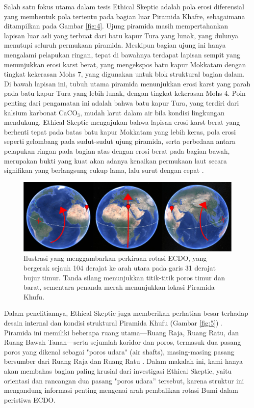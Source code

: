 \documentclass[10pt,twocolumn,letterpaper]{article}
\begin{document}
Salah satu fokus utama dalam tesis Ethical Skeptic adalah pola erosi diferensial yang membentuk pola tertentu pada bagian luar Piramida Khafre, sebagaimana ditampilkan pada Gambar \ref{fig:4}. Ujung piramida masih mempertahankan lapisan luar asli yang terbuat dari batu kapur Tura yang lunak, yang dulunya menutupi seluruh permukaan piramida. Meskipun bagian ujung ini hanya mengalami pelapukan ringan, tepat di bawahnya terdapat lapisan sempit yang menunjukkan erosi karst berat, yang mengekspos batu kapur Mokkatam dengan tingkat kekerasan Mohs 7, yang digunakan untuk blok struktural bagian dalam. Di bawah lapisan ini, tubuh utama piramida menunjukkan erosi karst yang parah pada batu kapur Tura yang lebih lunak, dengan tingkat kekerasan Mohs 4. Poin penting dari pengamatan ini adalah bahwa batu kapur Tura, yang terdiri dari kalsium karbonat CaCO$_3$, mudah larut dalam air bila kondisi lingkungan mendukung. Ethical Skeptic mengajukan bahwa lapisan erosi karst berat yang berhenti tepat pada batas batu kapur Mokkatam yang lebih keras, pola erosi seperti gelombang pada sudut-sudut ujung piramida, serta perbedaan antara pelapukan ringan pada bagian atas dengan erosi berat pada bagian bawah, merupakan bukti yang kuat akan adanya kenaikan permukaan laut secara signifikan yang berlangsung cukup lama, lalu surut dengan cepat \cite{27}.

\begin{figure}[b]
\begin{center}
\includegraphics[width=1\textwidth]{drawing.jpg}
\end{center}
   \caption{Ilustrasi yang menggambarkan perkiraan rotasi ECDO, yang bergerak sejauh 104 derajat ke arah utara pada garis 31 derajat bujur timur. Tanda silang menunjukkan titik-titik poros timur dan barat, sementara penanda merah menunjukkan lokasi Piramida Khufu.}
\label{fig:6}
\end{figure}

Dalam penelitiannya, Ethical Skeptic juga memberikan perhatian besar terhadap desain internal dan kondisi struktural Piramida Khufu (Gambar \ref{fig:5}) \cite{28}. Piramida ini memiliki beberapa ruang utama—Ruang Raja, Ruang Ratu, dan Ruang Bawah Tanah—serta sejumlah koridor dan poros, termasuk dua pasang poros yang dikenal sebagai "poros udara" (air shafts), masing-masing pasang bersumber dari Ruang Raja dan Ruang Ratu \cite{29,30}. Dalam makalah ini, kami hanya akan membahas bagian paling krusial dari investigasi Ethical Skeptic, yaitu orientasi dan rancangan dua pasang "poros udara” tersebut, karena struktur ini mengandung informasi penting mengenai arah pembalikan rotasi Bumi dalam peristiwa ECDO.
\end{document}

